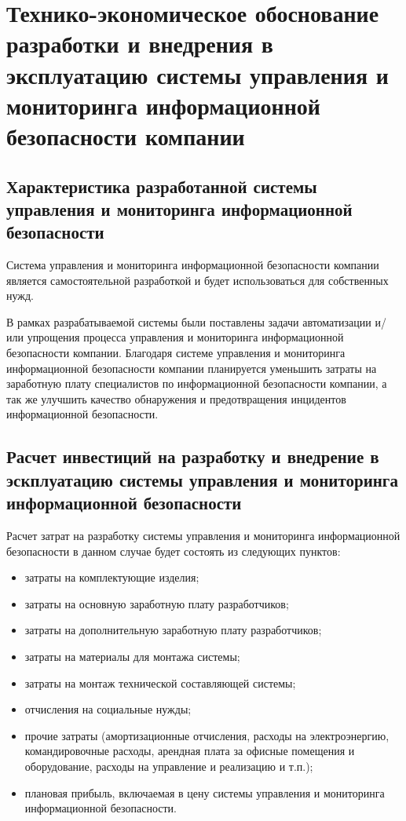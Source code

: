 \section{Технико-экономическое обоснование разработки и внедрения в эксплуатацию системы управления и мониторинга информационной безопасности компании}
\label{sec:economics}

\subsection{Характеристика разработанной системы управления и мониторинга информационной безопасности}

Система управления и мониторинга информационной безопасности компании является самостоятельной разработкой и будет использоваться для собственных нужд.

В рамках разрабатываемой системы были поставлены задачи автоматизации и/или упрощения процесса управления и мониторинга информационной безопасности компании. Благодаря системе управления и мониторинга информационной безопасности компании планируется уменьшить затраты на заработную плату специалистов по информационной безопасности компании, а так же улучшить качество обнаружения и предотвращения инцидентов информационной безопасности.

\subsection{Расчет инвестиций на разработку и внедрение в эскплуатацию системы управления и мониторинга информационной безопасности}
Расчет затрат на разработку системы управления и мониторинга информационной безопасности в данном случае будет состоять из следующих пунктов:
\begin{itemize}
    \item затраты на комплектующие изделия;
    \item затраты на основную заработную плату разработчиков;
    \item затраты на дополнительную заработную плату разработчиков;
    \item затраты на материалы для монтажа системы;
    \item затраты на монтаж технической составляющей системы;
    \item отчисления на социальные нужды;
    \item прочие затраты (амортизационные отчисления, расходы на электроэнергию, командировочные расходы, арендная плата за офисные помещения и оборудование, расходы на управление и реализацию и т.п.);
    \item плановая прибыль, включаемая в цену системы управления и мониторинга информационной безопасности.
\end{itemize}

